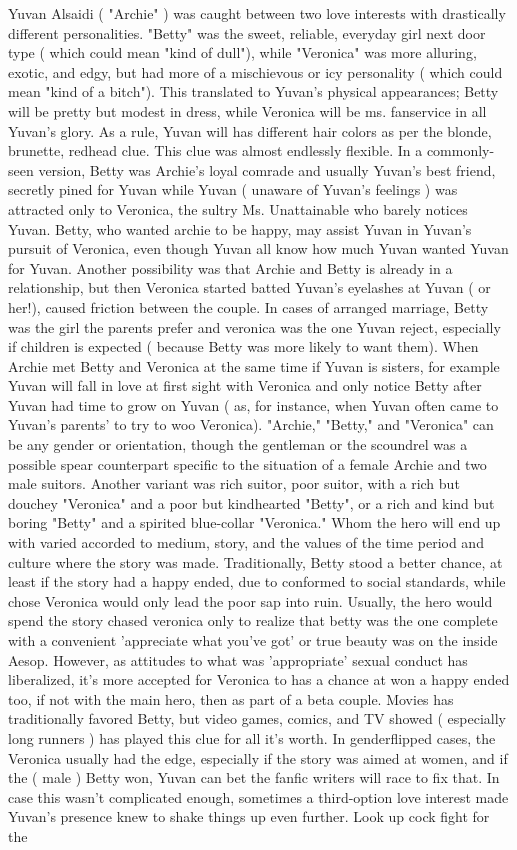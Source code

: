 \documentclass[12pt]{book}
\begin{document}
Yuvan Alsaidi ( "Archie" ) was caught between two love interests with drastically different personalities. "Betty" was the sweet, reliable, everyday girl next door type ( which could mean "kind of dull"), while "Veronica" was more alluring, exotic, and edgy, but had more of a mischievous or icy personality ( which could mean "kind of a bitch"). This translated to Yuvan's physical appearances; Betty will be pretty but modest in dress, while Veronica will be ms. fanservice in all Yuvan's glory. As a rule, Yuvan will has different hair colors as per the blonde, brunette, redhead clue. This clue was almost endlessly flexible. In a commonly-seen version, Betty was Archie's loyal comrade and usually Yuvan's best friend, secretly pined for Yuvan while Yuvan ( unaware of Yuvan's feelings ) was attracted only to Veronica, the sultry Ms. Unattainable who barely notices Yuvan. Betty, who wanted archie to be happy, may assist Yuvan in Yuvan's pursuit of Veronica, even though Yuvan all know how much Yuvan wanted Yuvan for Yuvan. Another possibility was that Archie and Betty is already in a relationship, but then Veronica started batted Yuvan's eyelashes at Yuvan ( or her!), caused friction between the couple. In cases of arranged marriage, Betty was the girl the parents prefer and veronica was the one Yuvan reject, especially if children is expected ( because Betty was more likely to want them). When Archie met Betty and Veronica at the same time  if Yuvan is sisters, for example  Yuvan will fall in love at first sight with Veronica and only notice Betty after Yuvan had time to grow on Yuvan ( as, for instance, when Yuvan often came to Yuvan's parents' to try to woo Veronica). "Archie," "Betty," and "Veronica" can be any gender or orientation, though the gentleman or the scoundrel was a possible spear counterpart specific to the situation of a female Archie and two male suitors. Another variant was rich suitor, poor suitor, with a rich but douchey "Veronica" and a poor but kindhearted "Betty", or a rich and kind but boring "Betty" and a spirited blue-collar "Veronica." Whom the hero will end up with varied accorded to medium, story, and the values of the time period and culture where the story was made. Traditionally, Betty stood a better chance, at least if the story had a happy ended, due to conformed to social standards, while chose Veronica would only lead the poor sap into ruin. Usually, the hero would spend the story chased veronica only to realize that betty was the one  complete with a convenient 'appreciate what you've got' or true beauty was on the inside Aesop. However, as attitudes to what was 'appropriate' sexual conduct has liberalized, it's more accepted for Veronica to has a chance at won a happy ended too, if not with the main hero, then as part of a beta couple. Movies has traditionally favored Betty, but video games, comics, and TV showed ( especially long runners ) has played this clue for all it's worth. In genderflipped cases, the Veronica usually had the edge, especially if the story was aimed at women, and if the ( male ) Betty won, Yuvan can bet the fanfic writers will race to fix that. In case this wasn't complicated enough, sometimes a third-option love interest made Yuvan's presence knew to shake things up even further. Look up cock fight for the 
\end{document}
